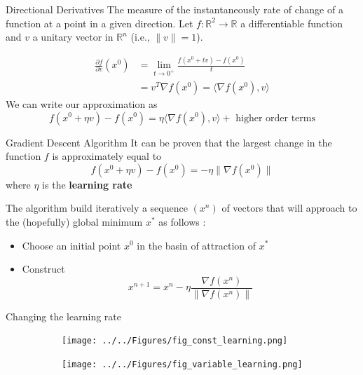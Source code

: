\documentclass{beamer}
\begin{document}
\begin{frame}{Directional Derivatives}
	The measure of the instantaneously rate of change of a function at a point in a given direction. 
	Let $f\colon \mathbb{R}^2 \to \mathbb{R}$ a differentiable function and $v$ a unitary vector in $\mathbb{R}^n$ (i.e., $\|v\|=1$). 

\begin{equation*}
	\begin{split}
		\frac{\partial f}{\partial v}(x^0)& = \lim_{t \to 0^+}\frac{f(x^0+tv)-f(x^0)}{t}\\
		&= v^T \nabla f(x^0) = \langle \nabla f(x^0), v \rangle
	\end{split}
\end{equation*}
We can write our approximation as
\begin{equation*}
	f(x^0+ \eta v)-f(x^0)= \eta \langle \nabla f(x^0), v \rangle + \text{ higher order terms}
\end{equation*}

\end{frame}

\begin{frame}{Gradient Descent Algorithm}
	It can be proven that the largest change in the function $f$ is approximately equal to 
	\begin{equation*}
		f(x^0+ \eta v)-f(x^0)= -\eta  \| \nabla f(x^0)\| 
	\end{equation*}
where $\eta$ is the \textbf{learning rate}

The algorithm build iteratively a sequence $(x^n)$ of vectors that will approach to the (hopefully) global minimum $x^*$ as follows :
\begin{itemize}
	\item Choose an initial point $x^0$ in the basin of attraction of  $x^*$
	\item Construct 
	\begin{equation*}
		x^{n+1}= x^n - \eta \frac{\nabla f(x^n)}{\| \nabla f(x^n)\|}
	\end{equation*} 
\end{itemize}
\end{frame}

\begin{frame}{Changing the learning rate}
\begin{figure}[h]
	\centering
	\begin{subfigure}{0.4\textwidth}
		\centering
			\texttt{[image: ../../Figures/fig\_const\_learning.png]}
	\end{subfigure}
	\begin{subfigure}{0.4\textwidth}
		\centering
		\texttt{[image: ../../Figures/fig\_variable\_learning.png]}
	\end{subfigure}
\end{figure}

\end{frame}
\end{document}
